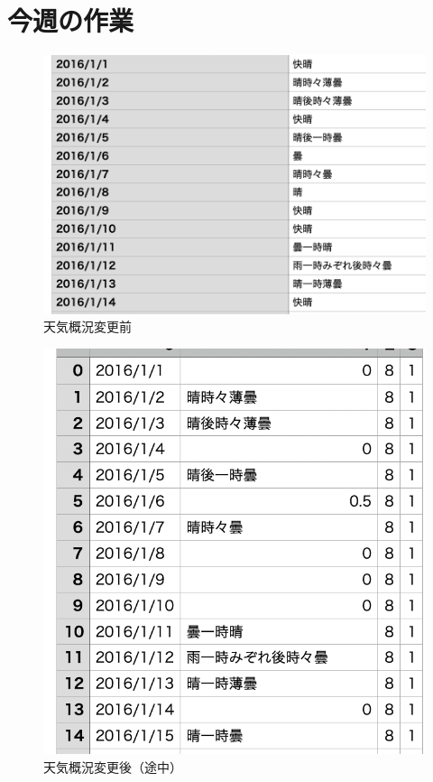 \section{今週の作業}
\begin{itemize}

\begin{figure}[phb]
\centering
\includegraphics[scale=0.8]{replace_1.png}
\caption{天気概況変更前}
\end{figure}
\begin{figure}[phb]
\centering
\includegraphics[scale=0.8]{replace_2.png}
\caption{天気概況変更後（途中）}
\end{figure}


\end{itemize}
